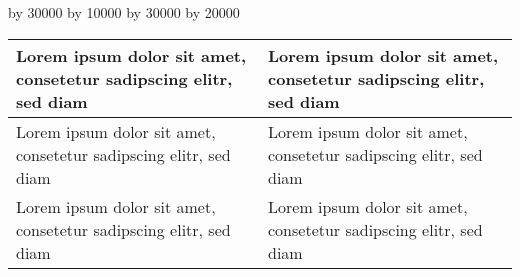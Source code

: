 
\begin{table}[htb]
\centering

\ifthenelse{\isundefined{\tabLenA}}{\newlength{\tabLenA}}{}
\ifthenelse{\isundefined{\tabLenB}}{\newlength{\tabLenB}}{}

\setlength{\tabLenA}{\textwidth}
\setlength{\tabLenB}{\textwidth}

\divide\tabLenA by 30000
\multiply\tabLenA by 10000
\divide\tabLenB by 30000
\multiply\tabLenB by 20000
\begin{tabular}{|p{\tabLenA}|p{\tabLenB}|}
\hline

Lorem ipsum dolor sit amet, consetetur sadipscing elitr, sed diam
&

Lorem ipsum dolor sit amet, consetetur sadipscing elitr, sed diam
\\
\hline
\hline

Lorem ipsum dolor sit amet, consetetur sadipscing elitr, sed diam
&

Lorem ipsum dolor sit amet, consetetur sadipscing elitr, sed diam
\\
\hline

Lorem ipsum dolor sit amet, consetetur sadipscing elitr, sed diam
&

Lorem ipsum dolor sit amet, consetetur sadipscing elitr, sed diam
\\
\hline
\end{tabular}
\end{table}
